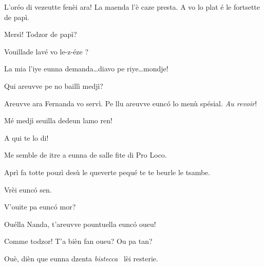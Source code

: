 \begin{drama}


\Eunfeurmiespeaks L’oréo di vezeutte fenèi ara! La maenda l’è caze presta.  A vo lo plat é le fortsette de papì.


\Gerominespeaks Mersì! Todzor de papì?

\Eunfeurmiespeaks Vouillade lavé vo le-z-éze \posate?

\Gerominespeaks La mia l'iye eunna demanda\ldots diavo pe riye\ldots mondje!

\Casimirspeaks Qui areuvve pe no baillì medjì?

\Eunfeurmiespeaks Areuvve ara Fernanda vo servì.  Pe llu  areuvve eunc\'o lo menù spésial. \textit{Au revoir}!


\Casimirspeaks{} Mé medjì seuilla dedeun lamo ren!

\Gerominespeaks A qui te lo di!

\Casimirspeaks Me semble de itre a eunna de salle fite di Pro Loco.

\Gerominespeaks Aprì fa totte pouzì desù le queverte pequé te te beurle le tsambe.

\Casimirspeaks Vrèi eunc\'o sen.




\Fernandaspeaks V'ouite pa eunc\'o mor?

\Casimirspeaks Ouélla Nanda, t’areuvve pountuella eunc\'o oueu!

\Fernandaspeaks Comme todzor! T’a bièn fan oueu? Ou pa tan?

\Casimirspeaks Ouè, dièn que eunna dzenta \textit{bistecca} \bistecca\ lèi resterie.


\end{drama}
